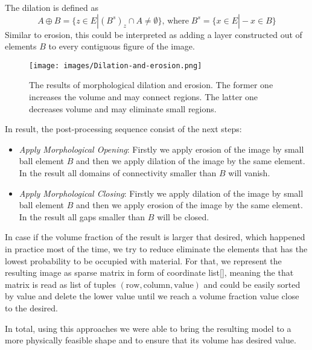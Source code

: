 The dilation is defined as 
\begin{equation}
A \oplus B = \{z \in E | (B^{s})_{z} \cap  A \neq \emptyset \}, \, \mathrm{where} \; B^{s}=\{x \in E | -x \in B \}
\end{equation} 
Similar to erosion, this could be interpreted as adding a layer constructed out of elements $B$ to every contiguous figure of the image. 
\medskip
\begin{figure}
	\centering
	\texttt{[image: images/Dilation-and-erosion.png]}
	\label{fig:dil-eros}
	\caption{The results of morphological dilation and erosion. The former one increases the volume and may connect regions. The latter one decreases volume and may eliminate small regions. }
\end{figure}

In result, the post-processing sequence consist of the next steps:
\begin{itemize}
	\item \emph{Apply Morphological Opening}: Firstly we apply erosion of the image by small ball element $B$ and then we apply dilation of the image by the same element. In the result all domains of connectivity smaller than $B$ will vanish.
	\item \emph{Apply Morphological Closing}: Firstly we apply dilation of the image by small ball element $B$ and then we apply erosion of the image by the same element. In the result all gaps smaller than $B$ will be closed.
\end{itemize}

In case if the volume fraction of the result is larger that desired, which happened in practice most of the time, we try to reduce eliminate the elements that has the lowest probability to be occupied with material.
For that, we represent the resulting image as sparse matrix in form of coordinate list\ref{}, meaning the that matrix is read as list of tuples $(\mathrm{row},\mathrm{column},\mathrm{value})$ and could be easily sorted by value and delete the lower value until we reach a volume fraction value close to the desired.

In total, using this approaches we were able to bring the resulting model to a more physically feasible shape and to ensure that its volume has desired value.



 